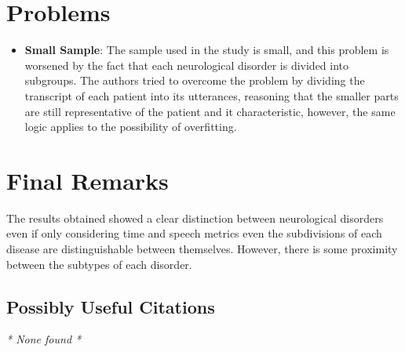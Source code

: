 \documentclass{Paper_Summary}
\begin{document}
\section{Problems}
    \begin{itemize}
        \item \textbf{Small Sample}: The sample used in the study is small, and this problem is worsened by the fact that each neurological disorder is divided into subgroups. The authors tried to overcome the problem by dividing the transcript of each patient into its utterances, reasoning that the smaller parts are still representative of the patient and it characteristic, however, the same logic applies to the possibility of overfitting.
    \end{itemize}


\section{Final Remarks}
    
    The results obtained showed a clear distinction between neurological disorders even if only considering time and speech metrics even the subdivisions of each disease are distinguishable between themselves. However, there is some proximity between the subtypes of each disorder.

\breakline

\begin{center}
    \section*{Possibly Useful Citations}
\end{center}
\emph{* None found *}
\end{document}
